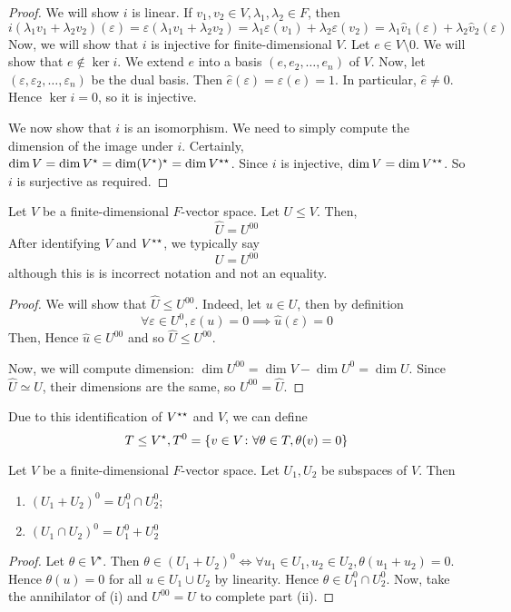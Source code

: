 \begin{proof}
	We will show \( i \) is linear.
	If \( v_1, v_2 \in V, \lambda_1, \lambda_2 \in F \), then
	\[
		i(\lambda_1 v_1 + \lambda_2 v_2) (\varepsilon) = \varepsilon(\lambda_1 v_1 + \lambda_2 v_2) = \lambda_1 \varepsilon(v_1) + \lambda_2 \varepsilon(v_2) = \lambda_1 \hat v_1(\varepsilon) + \lambda_2 \hat v_2(\varepsilon)
	\]
	Now, we will show that \( i \) is injective for finite-dimensional \( V \).
	Let \( e \in V \setminus \qty{0} \).
	We will show that \( e \not\in \ker i \).
	We extend \( e \) into a basis \( (e, e_2, \dots, e_n) \) of \( V \).
	Now, let \( (\varepsilon, \varepsilon_2, \dots, \varepsilon_n) \) be the dual basis.
	Then \( \hat e(\varepsilon) = \varepsilon(e) = 1 \).
	In particular, \( \hat e \neq 0 \).
	Hence \( \ker i = \qty{0} \), so it is injective.

	We now show that \( i \) is an isomorphism.
	We need to simply compute the dimension of the image under \( i \).
	Certainly, \( \dim V = \dim V^\star = \dim (V^\star)^\star = \dim V^{\star\star} \).
	Since \( i \) is injective, \( \dim V = \dim V^{\star\star} \).
	So \( i \) is surjective as required.
\end{proof}
\begin{lemma}
	Let \( V \) be a finite-dimensional \( F \)-vector space.
	Let \( U \leq V \).
	Then,
	\[
		\hat U = U^{00}
	\]
	After identifying \( V \) and \( V^{\star\star} \), we typically say
	\[
		U = U^{00}
	\]
	although this is is incorrect notation and not an equality.
\end{lemma}
\begin{proof}
	We will show that \( \hat U \leq U^{00} \).
	Indeed, let \( u \in U \), then by definition
	\[
		\forall \varepsilon \in U^0, \varepsilon(u) = 0 \implies \hat u(\varepsilon) = 0
	\]
	Then,
	Hence \( \hat u \in U^{00} \) and so \( \hat U \leq U^{00} \).

	Now, we will compute dimension:	\( \dim U^{00} = \dim V - \dim U^0 = \dim U \).
	Since \( \hat U \simeq U \), their dimensions are the same, so \( U^{00} = \hat U \).
\end{proof}
\begin{remark}
	Due to this identification of \( V^{\star\star} \) and \( V \), we can define
	\[
		T \leq V^\star, T^0 = \qty{v \in V \colon \forall \theta \in T, \theta(v) = 0}
	\]
\end{remark}
\begin{lemma}
	Let \( V \) be a finite-dimensional \( F \)-vector space.
	Let \( U_1, U_2 \) be subspaces of \( V \).
	Then
	\begin{enumerate}
		\item \( (U_1 + U_2)^0 = U_1^0 \cap U_2^0 \);
		\item \( (U_1 \cap U_2)^0 = U_1^0 + U_2^0 \)
	\end{enumerate}
\end{lemma}
\begin{proof}
	Let \( \theta \in V^\star \).
	Then \( \theta \in (U_1 + U_2)^0 \iff \forall u_1 \in U_1, u_2 \in U_2, \theta(u_1 + u_2) = 0 \).
	Hence \( \theta(u) = 0 \) for all \( u \in U_1 \cup U_2 \) by linearity.
	Hence \( \theta \in U_1^0 \cap U_2^0 \).
	Now, take the annihilator of (i) and \( U^{00} = U \) to complete part (ii).
\end{proof}
